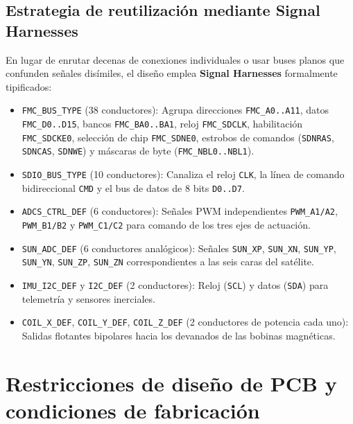 \documentclass[11pt,a4paper]{article}
\begin{document}
\subsection{Estrategia de reutilización mediante Signal Harnesses}
En lugar de enrutar decenas de conexiones individuales o usar buses planos que confunden señales disímiles, el diseño emplea \textbf{Signal Harnesses} formalmente tipificados:
\begin{itemize}
    \item \texttt{FMC\_BUS\_TYPE} (38 conductores): Agrupa direcciones \texttt{FMC\_A0..A11}, datos \texttt{FMC\_D0..D15}, bancos \texttt{FMC\_BA0..BA1}, reloj \texttt{FMC\_SDCLK}, habilitación \texttt{FMC\_SDCKE0}, selección de chip \texttt{FMC\_SDNE0}, estrobos de comandos (\texttt{SDNRAS}, \texttt{SDNCAS}, \texttt{SDNWE}) y máscaras de byte (\texttt{FMC\_NBL0..NBL1}).
    \item \texttt{SDIO\_BUS\_TYPE} (10 conductores): Canaliza el reloj \texttt{CLK}, la línea de comando bidireccional \texttt{CMD} y el bus de datos de 8 bits \texttt{D0..D7}.
    \item \texttt{ADCS\_CTRL\_DEF} (6 conductores): Señales PWM independientes \texttt{PWM\_A1/A2}, \texttt{PWM\_B1/B2} y \texttt{PWM\_C1/C2} para comando de los tres ejes de actuación.
    \item \texttt{SUN\_ADC\_DEF} (6 conductores analógicos): Señales \texttt{SUN\_XP}, \texttt{SUN\_XN}, \texttt{SUN\_YP}, \texttt{SUN\_YN}, \texttt{SUN\_ZP}, \texttt{SUN\_ZN} correspondientes a las seis caras del satélite.
    \item \texttt{IMU\_I2C\_DEF} y \texttt{I2C\_DEF} (2 conductores): Reloj (\texttt{SCL}) y datos (\texttt{SDA}) para telemetría y sensores inerciales.
    \item \texttt{COIL\_X\_DEF}, \texttt{COIL\_Y\_DEF}, \texttt{COIL\_Z\_DEF} (2 conductores de potencia cada uno): Salidas flotantes bipolares hacia los devanados de las bobinas magnéticas.
\end{itemize}

\section{Restricciones de diseño de PCB y condiciones de fabricación}\label{sec:fab}
\end{document}
